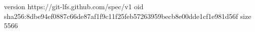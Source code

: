 version https://git-lfs.github.com/spec/v1
oid sha256:8dbe94ef0887c66de87af1f9c11f25feb57263959becb8e00dde1cf1e981d56f
size 5566
